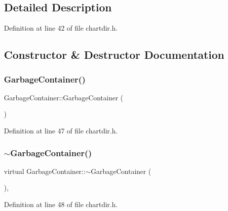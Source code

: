 \subsection{Detailed Description}


Definition at line 42 of file chartdir.\+h.



\subsection{Constructor \& Destructor Documentation}
\mbox{\label{class_garbage_container_a326a3f2d0770a301ea7d8bcd30d72d03}} 
\subsubsection{\texorpdfstring{Garbage\+Container()}{GarbageContainer()}}
{\footnotesize\ttfamily Garbage\+Container\+::\+Garbage\+Container (\begin{DoxyParamCaption}{ }\end{DoxyParamCaption})\hspace{0.3cm}{\ttfamily [inline]}}



Definition at line 47 of file chartdir.\+h.

\mbox{\label{class_garbage_container_aec9bd6ec3acc7352de624920716f6761}} 
\subsubsection{\texorpdfstring{$\sim$\+Garbage\+Container()}{~GarbageContainer()}}
{\footnotesize\ttfamily virtual Garbage\+Container\+::$\sim$\+Garbage\+Container (\begin{DoxyParamCaption}{ }\end{DoxyParamCaption})\hspace{0.3cm}{\ttfamily [inline]}, {\ttfamily [virtual]}}



Definition at line 48 of file chartdir.\+h.



